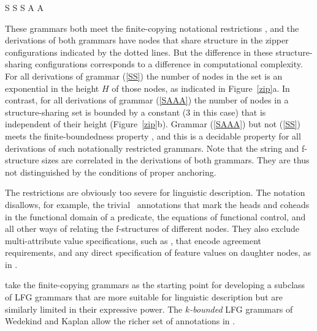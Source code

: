 \documentclass[output=paper,hidelinks]{langscibook}
\begin{document}
\ea
\ea\label{SS}\small S \rarrow {}     \hsp{5em}     S \rarrow {}
\ex\label{SAAA}
\vspace{1em}
\small S \rarrow {} \hsp{-.6em}  \hsp{-.6em}    \hsp{1.4em}     A \rarrow {}\hsp{-1.25em}  \hsp{1.2em} A \rarrow {}
\z\z

\noindent
These grammars  both meet the finite-copying notational restrictions , and the derivations of both grammars have nodes that share structure in the zipper configurations indicated by the dotted lines. But the difference in these structure-sharing configurations corresponds to a difference in computational complexity.  For all derivations of grammar (\ref{SS}) the number of nodes in the set    is an  exponential in the height $H$ of those nodes, as indicated in Figure~\ref{zip}a.  In contrast, for all derivations of grammar (\ref{SAAA})  the number of nodes in a structure-sharing set is bounded by a constant (3 in this case) that is independent of their height (Figure~\ref{zip}b).  Grammar (\ref{SAAA}) but not (\ref{SS}) meets the finite-boundedness property , and this is a decidable property for all derivations of such notationally restricted grammars. Note that the string and f-structure sizes are correlated in the derivations of both grammars. They are thus not distinguished by the conditions of proper anchoring.

The restrictions  are obviously too severe for linguistic description. The notation disallows, for example,  the trivial \trivial\ annotations that mark the heads and coheads in the functional domain of a predicate, the  equations of functional control, and all other ways of relating the f-structures of different nodes.  They also exclude multi-attribute value specifications, such as , that encode agreement requirements, and any direct specification of feature values on daughter nodes, as in .

 \cite{wed:kap:20} take the \cite{SekiEtAl1993} finite-copying grammars as the starting point for developing a subclass of LFG grammars that are more suitable for linguistic description but are similarly limited in their expressive power. The \textit{$k$-bounded} LFG grammars of Wedekind and Kaplan allow the richer set of annotations in .
\end{document}
